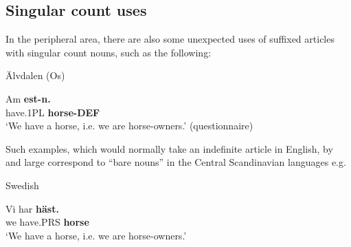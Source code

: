 \subsection{\rmfamily Singular count uses}
\label{bkm:Ref224379285}
In the peripheral area, there are also some unexpected uses of suffixed articles with singular count nouns, such as the following:


\item 

\label{bkm:Ref224102863}Älvdalen (Os)



 \ea\label{}
\gll Am  \textbf{est-n.}\\


have.1PL  \textbf{horse-DEF}\\

\glt ‘We have a horse, i.e. we are horse-owners.’ (questionnaire)

\z

Such examples, which would normally take an indefinite article in English, by and large correspond to “bare nouns” in the Central Scandinavian languages e.g.


\item 

\label{bkm:Ref224102890}Swedish



 \ea\label{}
\gll Vi  har  \textbf{häst.}\\


we  have.PRS  \textbf{horse}\\

\glt ‘We have a horse, i.e. we are horse-owners.’

